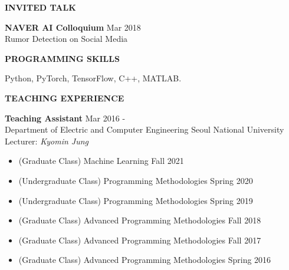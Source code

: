 \documentclass[12pt]{article}
\begin{document}

\begin{center}
	{\noindent \bfseries INVITED TALK}
    \noindent\makebox[\linewidth]{\rule{0.75\paperwidth}{0.4pt}}
\end{center}

\noindent
{\bfseries NAVER AI Colloquium} \hfill Mar 2018 \\ 
\noindent Rumor Detection on Social Media \\ 

\vspace{0.2in} %


\begin{center}
	{\noindent \bfseries PROGRAMMING SKILLS}
    \noindent\makebox[\linewidth]{\rule{0.75\paperwidth}{0.4pt}}
\end{center}
\noindent
Python, PyTorch, TensorFlow, C++, MATLAB. 
\vspace{0.2in} %


\begin{center}
	{\noindent \bfseries TEACHING EXPERIENCE}
    \noindent\makebox[\linewidth]{\rule{0.75\paperwidth}{0.4pt}}
\end{center}

\noindent
{\bfseries Teaching Assistant} \hfill Mar 2016 -  \\ 
\noindent Department of Electric and Computer Engineering \hfill Seoul National University \\ 
\noindent Lecturer: \textit{Kyomin Jung}
\vspace{6pt}
\begin{itemize} \itemsep -2pt %
	\item (Graduate Class) Machine Learning \hfill Fall 2021
	\item (Undergraduate Class) Programming Methodologies \hfill Spring 2020
	\item (Undergraduate Class) Programming Methodologies \hfill Spring 2019
	\item (Graduate Class) Advanced Programming Methodologies \hfill Fall 2018
	\item (Graduate Class) Advanced Programming Methodologies \hfill Fall 2017
	\item (Graduate Class) Advanced Programming Methodologies \hfill Spring 2016
\end{itemize}
\end{document}
